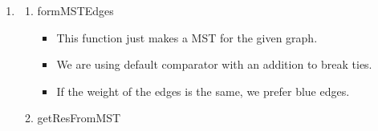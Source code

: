 \documentclass{report}
\begin{document}
\begin{titlepage}
\begin{enumerate}[label={\fontsize{14}{16}\selectfont \arabic*.}]
\begin{enumerate}
\begin{itemize}
                            \fontsize{12}{14} \selectfont

                            \item To track the connected components of the
                                  graph as we insert edges to form a MST.
                            \item Has function to find the root of the
                                  connected component and to perform the union
                                  of two sets.

                        \end{itemize}

              \end{enumerate}

              \vspace{0.8em}
        \item {\fontsize{14}{16} \selectfont {}}

              \begin{enumerate}

                  \item {\fontsize{13}{14} \selectfont formMSTEdges}

                        \begin{itemize}

                            \fontsize{12}{14} \selectfont

                            \item This function just makes a MST for the given
                                  graph.
                            \item We are using default comparator with an
                                  addition to break ties.
                            \item If the weight of the edges is the same, we
                                  prefer blue edges.

                        \end{itemize}
                        \vspace{0.8em}

                  \item {\fontsize{13}{14} \selectfont getResFromMST}

                        \begin{itemize}

                            \fontsize{12}{14} \selectfont


\end{itemize}
\end{enumerate}
\end{enumerate}
\end{titlepage}
\end{document}
